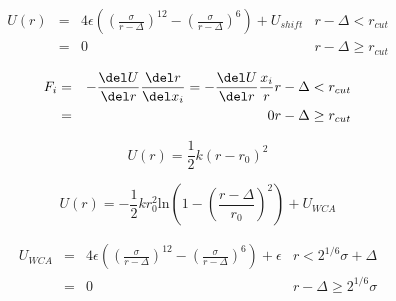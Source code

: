 \documentclass{article}
\begin{document}
\begin{eqnarray*} U(r) &=& 4\epsilon\left(\left(\frac{\sigma}{r-\Delta}\right)^{12} - \left(\frac{\sigma}{r-\Delta}\right)^{6}\right) + U_{shift} & r - \Delta < r_{cut} \\ &=& 0 & r - \Delta \ge r_{cut} \end{eqnarray*}
\pagebreak

\begin{eqnarray*} F_i &=& -\frac{\del U}{\del r}\frac{\del r}{\del x_i} = -\frac{\del U}{\del r}\frac{x_i}{r} & r - \Delta < r_{cut} \\ &=& 0 & r - \Delta \ge r_{cut} \end{eqnarray*}
\pagebreak

\[ U(r) = \frac{1}{2}k\left(r - r_{0}\right)^2 \]
\pagebreak

\[ U(r) = -\frac{1}{2}kr_{0}^2\text{ln}\left(1-\left(\frac{r-\Delta}{r_0}\right)^2\right) + U_{WCA} \]
\pagebreak

\begin{eqnarray*} U_{WCA} &=& 4\epsilon \left( \left( \frac{\sigma}{r-\Delta} \right)^{12} - \left( \frac{\sigma}{r-\Delta} \right)^6 \right) + \epsilon & r < 2^{1/6}\sigma+\Delta \\ &=& 0 &r-\Delta \ge 2^{1/6}\sigma \end{eqnarray*}
\pagebreak
\end{document}
